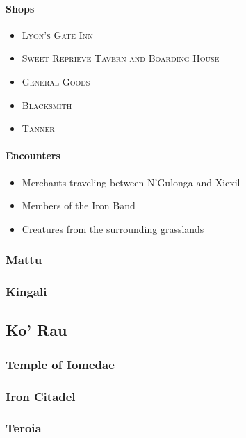 			\paragraph{Shops}

				\begin{itemize}
					\item \textsc{Lyon's Gate Inn}
					\item \textsc{Sweet Reprieve Tavern and Boarding House}
					\item \textsc{General Goods}
					\item \textsc{Blacksmith}
					\item \textsc{Tanner}
				\end{itemize}

			\paragraph{Encounters}
				\begin{itemize}
					\item Merchants traveling between N'Gulonga
						and Xicxil
					\item Members of the Iron Band
					\item Creatures from the surrounding grasslands
				\end{itemize}
				
		\subsubsection{Mattu}

		\subsubsection{Kingali}

	\subsection{Ko' Rau}

		\subsubsection{Temple of Iomedae}

		\subsubsection{Iron Citadel}

		\subsubsection{Teroia}

